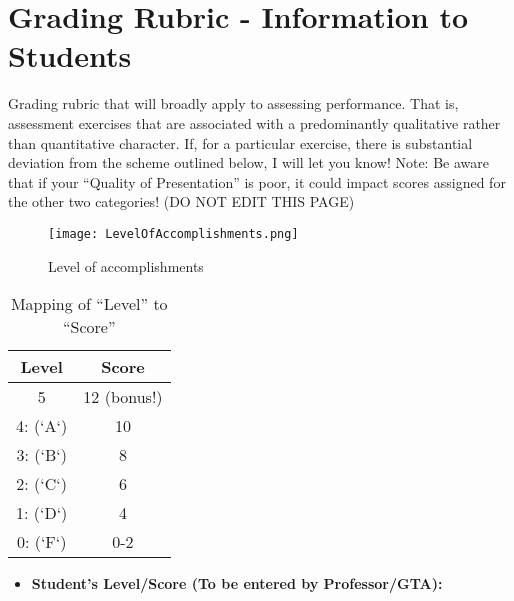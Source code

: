 %
\section*{Grading Rubric - Information to Students}

Grading rubric that will broadly apply to assessing performance. That is, assessment exercises that are associated with a predominantly qualitative rather than quantitative character. If, for a particular exercise, there is substantial deviation from the scheme outlined below, I will let you know! Note: Be aware that if your “Quality of Presentation” is poor, it could impact scores assigned for the other two categories! (DO NOT EDIT THIS PAGE)
\begin{figure}[ht!]
    \centering
    \texttt{[image: LevelOfAccomplishments.png]}
    \caption{Level of accomplishments}
    \label{fig:Level of accomplishments}
\end{figure}
\begin{table}[h]
    \centering
    \begin{tabular}{|c|c|}
    \hline
        Level &  Score \\
        \hline
        \hline
        5 &  12 (bonus!) \\
        \hline
        4: (`A`) &  10 \\
        \hline
        3: (`B`) &  8 \\
        \hline
        2: (`C`) &  6 \\
        \hline
        1: (`D`) &  4 \\
        \hline
        0: (`F`) &  0-2 \\
        \hline
    \end{tabular}
    \caption{Mapping of “Level” to “Score”}
    \label{tab:Mapping}
\end{table}
\begin{itemize}
    \item \textbf{Student's Level/Score (To be entered by Professor/GTA):}
\end{itemize}



